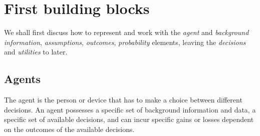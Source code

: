 \documentclass[
  a4paper,
  DIV=11,
  numbers=noendperiod,
  oneside]{scrreprt}
\begin{document}

\hypertarget{first-building-blocks}{%
\chapter{First building blocks}\label{first-building-blocks}}

\providecommand{\ul}{\uline}
\renewcommand*{\|}[1][]{\nonscript\:#1\vert\nonscript\:\mathopen{}}
\providecommand*{\pr}[1]{\textsf{\small`#1'}}
\renewcommand*{\pr}[1]{\textsf{\small`#1'}}
\providecommand*{\prq}[1]{\textsf{\small #1}}
\renewcommand*{\prq}[1]{\textsf{\small #1}}
\providecommand{\se}[1]{\mathsfit{#1}}
\renewcommand{\se}[1]{\mathsfit{#1}}
\providecommand{\p}{\mathrm{p}}
\renewcommand{\p}{\mathrm{p}}
\renewcommand{\P}{\mathrm{P}}

We shall first discuss how to represent and work with the \emph{agent}
and \emph{background information}, \emph{assumptions}, \emph{outcomes},
\emph{probability} elements, leaving the \emph{decisions} and
\emph{utilities} to later.

\hypertarget{agents}{%
\section{Agents}\label{agents}}

The agent is the person or device that has to make a choice between
different decisions. An agent possesses a specific set of background
information and data, a specific set of available decisions, and can
incur specific gains or losses dependent on the outcomes of the
available decisions.

\end{document}
